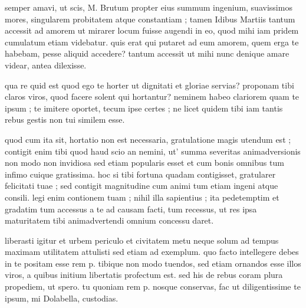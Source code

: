  semper amavi, ut scis, M. Brutum propter eius summum ingenium, suavissimos mores, singularem probitatem atque constantiam ; tamen Idibus Martiis tantum accessit ad amorem ut mirarer locum fuisse augendi in eo, quod mihi iam pridem cumulatum etiam videbatur. quis erat qui putaret ad eum amorem, quem erga te habebam, pesse aliquid accedere? tantum accessit ut mihi nunc denique amare videar, antea dilexisse.

 qua re quid est quod ego te horter ut dignitati et gloriae servias? proponam tibi claros viros, quod facere solent qui hortantur? neminem habeo clariorem quam te ipsum ; te imitere oportet, tecum ipse certes ; ne licet quidem tibi iam tantis rebus gestis non tui similem esse.

 quod cum ita sit, hortatio non est necessaria, gratulatione magis utendum est ; contigit enim tibi quod haud scio an nemini, ut' summa severitas animadversionis non modo non invidiosa sed etiam popularis esset et cum bonis omnibus tum infimo cuique gratissima. hoc si tibi fortuna quadam contigisset, gratularer felicitati tuae ; sed contigit magnitudine cum animi tum etiam ingeni atque consili. legi enim contionem tuam ; nihil illa sapientius ; ita pedetemptim et gradatim tum accessus a te ad causam facti, tum recessus, ut res ipsa maturitatem tibi animadvertendi omnium concessu daret.

 liberasti igitur et urbem periculo et civitatem metu neque solum ad tempus maximam utilitatem attulisti sed etiam ad exemplum. quo facto intellegere debes in te positam esse rem p. tibique non modo tuendos, sed etiam ornandos esse illos viros, a quibus initium libertatis profectum est. sed his de rebus coram plura propediem, ut spero. tu quoniam rem p. nosque conservas, fac ut diligentissime te ipsum, mi Dolabella, custodias.

